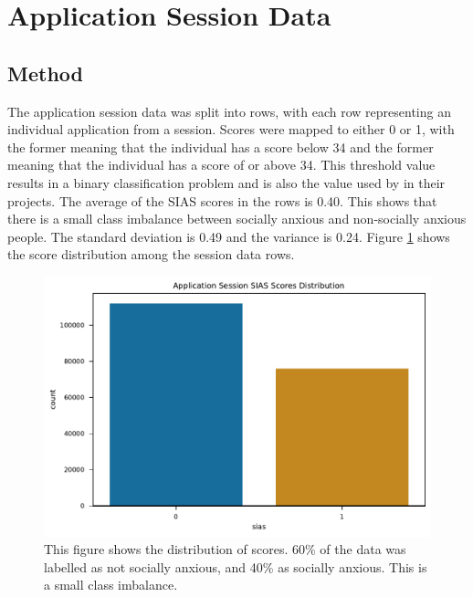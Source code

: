 \documentclass{l4proj}
\begin{document}
\section{Application Session Data}
\subsection{Method}
The application session data was split into rows, with each row representing an individual application from a session. Scores were mapped to either 0 or 1, with the former meaning that the individual has a score below 34 and the former meaning that the individual has a score of or above 34. This threshold value results in a binary classification problem and is also the value used by \cite{wood, boukhechba} in their projects. The average of the SIAS scores in the rows is \num{0.40}. This shows that there is a small class imbalance between socially anxious and non-socially anxious people. The standard deviation is \num{0.49} and the variance is \num{0.24}. Figure \ref{fig:session_sias_distribution} shows the score distribution among the session data rows.

\begin{figure}[htb]
    \centering
    \includegraphics[width=0.65\linewidth]{images/sessions/bar_chart_ApplicationSessionSIASScoresDistribution.pdf}
    \caption{This figure shows the distribution of scores. \num{60}\% of the data was labelled as not socially anxious, and \num{40}\% as socially anxious. This is a small class imbalance.}
    \label{fig:session_sias_distribution} 
\end{figure}
\end{document}
